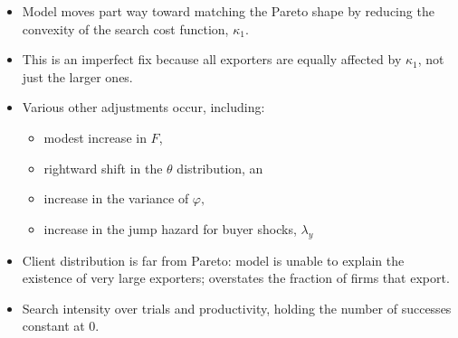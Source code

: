 \documentclass[notes=show]{beamer}
\begin{document}
\begin{frame}%



\begin{itemize}
\item Model moves part way toward matching the Pareto shape by reducing the
convexity of the search cost function, $\kappa _{1}.$

\item This is an imperfect fix because all exporters are equally affected by 
$\kappa _{1}$, not just the larger ones.

\item Various other adjustments occur, including:

\begin{itemize}
\item modest increase in $F$,

\item rightward shift in the $\theta $ distribution, an

\item increase in the variance of $\varphi ,$

\item increase in the jump hazard for buyer shocks, $\lambda _{y}$
\end{itemize}

\item Client distribution is far from Pareto: model is unable to explain the
existence of very large exporters; overstates the fraction of firms that
export.
\end{itemize}

\end{frame}%
\begin{frame}%


\begin{itemize}
\item Search intensity over trials and productivity, holding the number of
successes constant at 0. 
\end{itemize}

\end{frame}%
\end{document}
